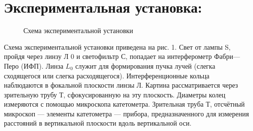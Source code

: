 \section*{Экспериментальная установка:}
    \begin{figure}[h!]
        \noindent{}
        \caption{Схема экспериментальной установки}
    \end{figure} 
    Схема экспериментальной установки приведена на рис. 1. Свет от лампы S, пройдя через линзу Л 0 и светофильтр С, попадает на интерферометр Фабри—Перо (ИФП). Линза $L_0$ служит для формирования пучка лучей (слегка сходящегося или слегка расходящегося). Интерференционные кольца наблюдаются в фокальной плоскости линзы Л. Картина рассматривается через зрительную трубу Т, сфокусированную на эту плоскость. Диаметры колец измеряются с помощью микроскопа катетометра. Зрительная труба Т, отсчётный микроскоп — элементы катетометра — прибора, предназначенного для измерения расстояний в вертикальной плоскости вдоль вертикальной оси.